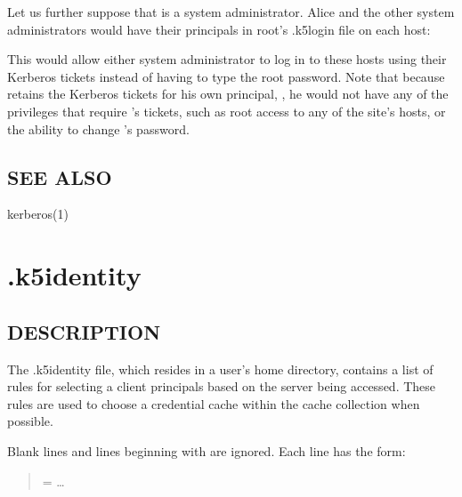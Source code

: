 \documentclass[letterpaper,10pt,english]{sphinxmanual}
\begin{document}
\sphinxAtStartPar
Let us further suppose that  is a system administrator.
Alice and the other system administrators would have their principals
in root’s .k5login file on each host:

\begin{sphinxVerbatim}[commandchars=\\\{\}]

\end{sphinxVerbatim}

\sphinxAtStartPar
This would allow either system administrator to log in to these hosts
using their Kerberos tickets instead of having to type the root
password.  Note that because  retains the Kerberos tickets for
his own principal, , he would not have any of the
privileges that require ’s tickets, such as root access to
any of the site’s hosts, or the ability to change ’s
password.


\subsection{SEE ALSO}
\label{\detokenize{user/user_config/k5login:see-also}}
\sphinxAtStartPar
kerberos(1)

\sphinxstepscope


\section{.k5identity}
\label{\detokenize{user/user_config/k5identity:k5identity}}\label{\detokenize{user/user_config/k5identity:k5identity-5}}\label{\detokenize{user/user_config/k5identity::doc}}

\subsection{DESCRIPTION}
\label{\detokenize{user/user_config/k5identity:description}}
\sphinxAtStartPar
The .k5identity file, which resides in a user’s home directory,
contains a list of rules for selecting a client principals based on
the server being accessed.  These rules are used to choose a
credential cache within the cache collection when possible.

\sphinxAtStartPar
Blank lines and lines beginning with \sphinxcode{\sphinxupquote{\#}} are ignored.  Each line has
the form:
\begin{quote}

\sphinxAtStartPar
{} = …
\end{quote}
\end{document}
